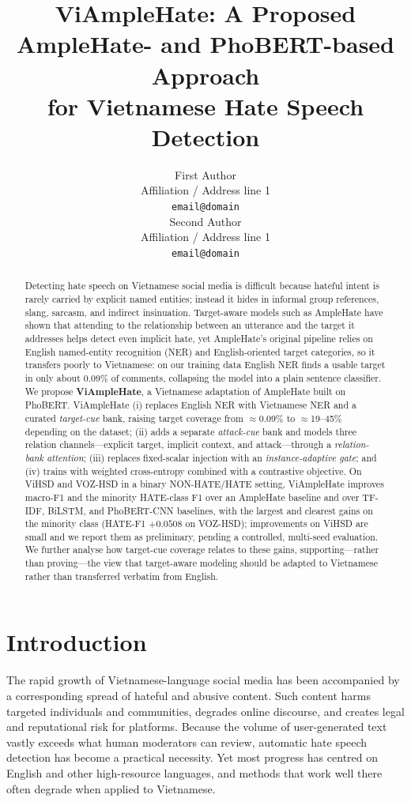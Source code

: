 \documentclass[11pt]{article}
\title{ViAmpleHate: A Proposed AmpleHate- and PhoBERT-based Approach\\ for Vietnamese Hate Speech Detection}
\author{First Author \\
  Affiliation / Address line 1 \\
  \texttt{email@domain} \\\And
  Second Author \\
  Affiliation / Address line 1 \\
  \texttt{email@domain} \\}
\begin{document}
\maketitle

\begin{abstract}
Detecting hate speech on Vietnamese social media is difficult because hateful intent is rarely carried by explicit named entities; instead it hides in informal group references, slang, sarcasm, and indirect insinuation. Target-aware models such as AmpleHate have shown that attending to the relationship between an utterance and the target it addresses helps detect even implicit hate, yet AmpleHate's original pipeline relies on English named-entity recognition (NER) and English-oriented target categories, so it transfers poorly to Vietnamese: on our training data English NER finds a usable target in only about 0.09\% of comments, collapsing the model into a plain sentence classifier. We propose \textbf{ViAmpleHate}, a Vietnamese adaptation of AmpleHate built on PhoBERT. ViAmpleHate (i) replaces English NER with Vietnamese NER and a curated \emph{target-cue} bank, raising target coverage from $\approx$0.09\% to $\approx$19--45\% depending on the dataset; (ii) adds a separate \emph{attack-cue} bank and models three relation channels---explicit target, implicit context, and attack---through a \emph{relation-bank attention}; (iii) replaces fixed-scalar injection with an \emph{instance-adaptive gate}; and (iv) trains with weighted cross-entropy combined with a contrastive objective. On ViHSD and VOZ-HSD in a binary NON-HATE/HATE setting, ViAmpleHate improves macro-F1 and the minority HATE-class F1 over an AmpleHate baseline and over TF-IDF, BiLSTM, and PhoBERT-CNN baselines, with the largest and clearest gains on the minority class (HATE-F1 $+0.0508$ on VOZ-HSD); improvements on ViHSD are small and we report them as preliminary, pending a controlled, multi-seed evaluation. We further analyse how target-cue coverage relates to these gains, supporting---rather than proving---the view that target-aware modeling should be adapted to Vietnamese rather than transferred verbatim from English.
\end{abstract}

\section{Introduction}

The rapid growth of Vietnamese-language social media has been accompanied by a corresponding spread of hateful and abusive content. Such content harms targeted individuals and communities, degrades online discourse, and creates legal and reputational risk for platforms. Because the volume of user-generated text vastly exceeds what human moderators can review, automatic hate speech detection has become a practical necessity. Yet most progress has centred on English and other high-resource languages, and methods that work well there often degrade when applied to Vietnamese.
\end{document}

